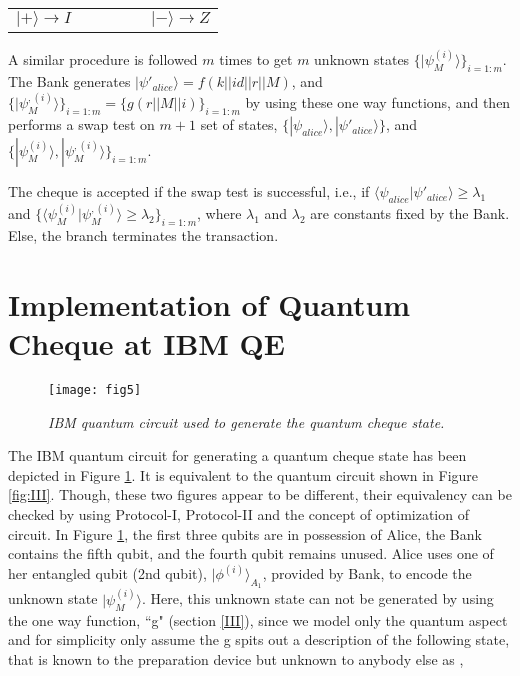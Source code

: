 \documentclass[aps,pra,twocolumn,groupedaddress,showpacs,showkeys]{revtex4-1}
\begin{document}
\begin{center}
	\begin{tabular}{ l c*{4}    l }
		$| +\rangle  \rightarrow I$ 			& & & & &	$|-\rangle \rightarrow Z$ 	\\
	\end{tabular}
\end{center}

A similar procedure is followed $m$ times to get $m$ unknown states $\{|\psi_M ^{(i)}\rangle \}_{i=1:m}$. The Bank generates $|\psi'_{alice}\rangle = f(k || id || r || M)$, and $\{|\psi_M^{,(i)} \rangle \}_{i=1:m} = \{g(r || M || i) \}_{i=1:m}$ by using these one way functions, and then performs a swap test on $m+1$ set of states, $\{|\psi_{alice}\rangle, |\psi'_{alice}\rangle\}$, and $\{|\psi_M^{(i)} \rangle, |\psi_M^{,(i)} \rangle \}_{i=1:m}$. 

The cheque is accepted if the swap test is successful, i.e., if $\langle \psi_{alice} \vert \psi'_{alice}\rangle \geq \lambda_1$ and $\{ \langle \psi_M^{(i)} \vert \psi_M^{,(i)}\rangle  \geq \lambda_2 \}_{i=1:m}$, where $\lambda_1$ and $\lambda_2$ are constants fixed by the Bank. Else, the branch terminates the transaction.

\section{Implementation of Quantum Cheque at IBM QE \label{IV}}

\begin{figure}[h]
    \centering
    \texttt{[image: fig5]}
    \caption{\emph{IBM quantum circuit used to generate the quantum cheque state.}}
    \label{fig:V}
\end{figure}

The IBM quantum circuit for generating a quantum cheque state has been depicted in Figure \ref{fig:V}. It is equivalent to the quantum circuit shown in Figure \ref{fig:III}. Though, these two figures appear to be different, their equivalency can be checked by using Protocol-I, Protocol-II and the concept of optimization of circuit. In Figure \ref{fig:V}, the first three qubits are in possession of Alice, the Bank contains the fifth qubit, and the fourth qubit remains unused. Alice uses one of her entangled qubit (2nd qubit), $|\phi^{(i)}\rangle_{A_1}$, provided by Bank, to encode the unknown state $|\psi_M^{(i)} \rangle$. Here, this unknown state can not be generated by using the one way function, ``g" (section \ref{III}), since we model only the quantum aspect and for simplicity only assume the g spits out a description of the following state, that is known to the preparation device but unknown to anybody else as \cite{Fedortchenko},  
\end{document}
